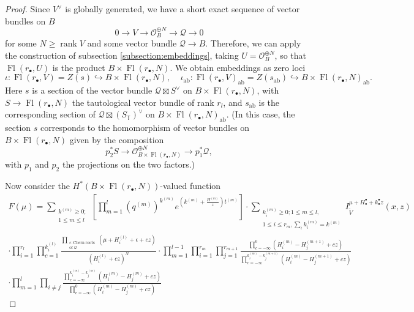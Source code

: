 \documentclass[a4paper,12pt]{amsart}
\numberwithin{equation}{section}
\theoremstyle{definition}
\newcommand{\T}{\mathbb{T}}
\newcommand{\cO}{\mathcal{O}}
\newcommand{\Fl}{\operatorname{Fl}}
\begin{document}
\begin{proof}
    Since $V^\vee$ is globally generated, we have a short exact sequence of vector bundles on $B$
    \begin{equation}\label{eqn:exact_sqn}
    0\to V\to \cO_B^{\oplus N}\to \mathcal{Q}\to 0
    \end{equation}
    for some $N\geq\operatorname{rank}V$ and some vector bundle $\mathcal{Q}\to B$.
    Therefore, we can apply the construction of subsection \ref{subsection:embeddings}, taking $U=\cO_B^{\oplus N}$, so that $\Fl(r_\bullet, U)$ is the product $B\times\Fl(r_\bullet,N)$.
    We obtain embeddings as zero loci
    \[\iota\colon\Fl(r_\bullet,V)= Z(s)\hookrightarrow B\times\Fl(r_\bullet,N),\;\;\;\;\iota_{\mathrm{ab}}\colon\Fl(r_\bullet,V)_{\mathrm{ab}}= Z(s_{\mathrm{ab}})\hookrightarrow B\times\Fl(r_\bullet,N)_{\mathrm{ab}}.\]
    Here $s$ is a section of the vector bundle $\mathcal{Q}\boxtimes S^\vee$ on $B\times\Fl(r_\bullet,N)$, with
 $S\to\Fl(r_\bullet,N)$ the tautological vector bundle of rank $r_l$, and $s_{\mathrm{ab}}$ is the corresponding section of $\mathcal{Q}\boxtimes (S_\T)^\vee$ on $B\times\Fl(r_\bullet,N)_{\mathrm{ab}}$. (In this case, the section $s$ corresponds to
 the homomorphism of vector bundles on $B\times\Fl(r_\bullet,N)$ given by the composition 
    $$p_2^*S\to \cO_{B\times\Fl(r_\bullet,N)}^{\oplus N}\to p_1^*\mathcal{Q},$$
    with $p_1$ and $p_2$ the projections on the two factors.)

    
    Now consider the $H^*(B\times\Fl(r_\bullet,N))$-valued function
    \begin{multline}\label{eqn:twisted_F}
        F(\mu) = \sum_{ \substack{k^{(m)}\geq0; \\1\leq m\leq l} } \left[ \prod_{m=1}^l (q^{(m)})^{k^{(m)}}e^{\left(k^{(m)}+\frac{H^{(m)}}{z}\right)t^{(m)}} \right] \cdot \sum_{ \substack{k_i^{(m)}\geq0; 1\leq m\leq l, \\ 1\leq i\leq r_m,\sum_ik_i^{(m)}=k^{(m)}} } I^{\mu+H_\bullet^\bullet+k_\bullet^\bullet z}_{\widetilde{V}}(x,z) \\ 
        \cdot \prod_{i=1}^{r_l}\prod_{c=1}^{k_i^{(l)}}\frac{ \prod_{ \substack{\epsilon\colon\mathrm{Chern\ roots} \\ \mathrm{of\ } \mathcal{Q}} } (\mu+H_i^{(l)}+\epsilon+cz) }{(H_i^{(l)}+cz)^N} 
        \cdot \prod_{m=1}^{l-1}\prod_{i=1}^{r_m}\prod_{j=1}^{r_{m+1}}\frac{\prod_{c=-\infty}^{0}(H_i^{(m)}-H_j^{(m+1)}+cz)}{\prod_{c=-\infty}^{k_i^{(m)}-k_j^{(m+1)}}(H_i^{(m)}-H_j^{(m+1)}+cz)} \\
        \cdot \prod_{m=1}^l\prod_{i\neq j}\frac{\prod_{c=-\infty}^{k_i^{(m)}-k_j^{(m)}}(H_i^{(m)}-H_j^{(m)}+cz)}{\prod_{c=-\infty}^{0}(H_i^{(m)}-H_j^{(m)}+cz)}
    \end{multline}


\end{proof}
\end{document}
